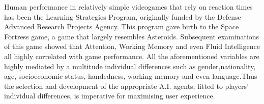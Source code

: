 Human performance in relatively simple videogames that rely on reaction times has been the Learning Strategies Program, originally funded by the Defense Advanced Research Projects Agency\cite{donchin1989learning}. This program gave birth to the Space Fortress game, a game that  largely resembles Asteroids\cite{boot2015video}. Subsequent examinations of this game showed that Attention, Working Memory and even Fluid Intelligence all highly correlated with game performance\cite{rabbitt1989space}. All the aforementioned variables are highly mediated by a multitude individual differences such as gender,nationality, age, socioeconomic status, handedness, working memory and even language\cite{lyle2008handedness}\cite{cazzato2010gender}\cite{stigler1986digit}\cite{templer2014relationship}\cite{greiner2014assessment}.Thus the selection and development of the appropriate A.I. agents, fitted to players’ individual differences, is imperative for maximising user experience. 
